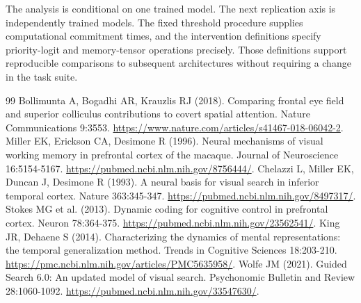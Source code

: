 \documentclass[11pt]{article}
\begin{document}
The analysis is conditional on one trained model. The next replication axis is independently trained models. The fixed threshold procedure supplies computational commitment times, and the intervention definitions specify priority-logit and memory-tensor operations precisely. Those definitions support reproducible comparisons to subsequent architectures without requiring a change in the task suite.

\begin{thebibliography}{99}
 Bollimunta A, Bogadhi AR, Krauzlis RJ (2018). Comparing frontal eye field and superior colliculus contributions to covert spatial attention. Nature Communications 9:3553. \url{https://www.nature.com/articles/s41467-018-06042-2}.
 Miller EK, Erickson CA, Desimone R (1996). Neural mechanisms of visual working memory in prefrontal cortex of the macaque. Journal of Neuroscience 16:5154-5167. \url{https://pubmed.ncbi.nlm.nih.gov/8756444/}.
 Chelazzi L, Miller EK, Duncan J, Desimone R (1993). A neural basis for visual search in inferior temporal cortex. Nature 363:345-347. \url{https://pubmed.ncbi.nlm.nih.gov/8497317/}.
 Stokes MG et al. (2013). Dynamic coding for cognitive control in prefrontal cortex. Neuron 78:364-375. \url{https://pubmed.ncbi.nlm.nih.gov/23562541/}.
 King JR, Dehaene S (2014). Characterizing the dynamics of mental representations: the temporal generalization method. Trends in Cognitive Sciences 18:203-210. \url{https://pmc.ncbi.nlm.nih.gov/articles/PMC5635958/}.
 Wolfe JM (2021). Guided Search 6.0: An updated model of visual search. Psychonomic Bulletin and Review 28:1060-1092. \url{https://pubmed.ncbi.nlm.nih.gov/33547630/}.
\end{thebibliography}
\end{document}
